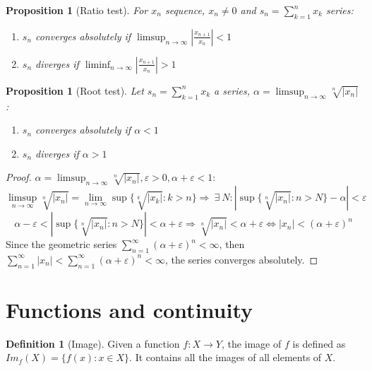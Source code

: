 \documentclass{article}
\newcommand{\DS}{\displaystyle}
\newcommand{\abs}[1]{\left|#1\right|}
\newcommand{\Ar}{\Rightarrow}
\newenvironment{enumrom}{\begin{enumerate}[label=(\roman*)]}{\end{enumerate}}
\newcommand{\fr}[2]{\frac{#1}{#2}}
\newcommand{\f}[3]{#1 : #2 \rightarrow #3}
\newcommand{\limn}{\lim_{n \to \infty}}
\newcommand{\limsupn}{\limsup_{n \to \infty}}
\newcommand{\liminfn}{\liminf_{n \to \infty}}
\theoremstyle{definition}
\newtheorem{definition}{Definition}[section]
\theoremstyle{definition}
\theoremstyle{plain}
\theoremstyle{plain}
\theoremstyle{plain}
\theoremstyle{plain}
\newtheorem{proposition}[theorem]{Proposition}
\theoremstyle{definition}
\theoremstyle{remark}
\theoremstyle{remark}
\theoremstyle{remark}
\theoremstyle{remark}
\newcommand{\sumn}{\sum_{k=1}^n}
\newcommand{\series}{\sum_{n=1}^\infty}
\newcommand{\Exists}{\ \exists \ }
\newcommand{\E}{\varepsilon}
\begin{document}
\begin{proposition}[Ratio test]
  For $x_n$ sequence, $x_n \neq 0$ and $\DS s_n = \sumn{x_k}$ series:
  \begin{enumrom}
    \item $s_n$ converges absolutely if $\limsupn \abs{\fr{x_{n+1}}{x_n}} < 1$
    \item $s_n$ diverges if $\liminfn \abs{\fr{x_{n+1}}{x_n}} > 1$
  \end{enumrom}
\end{proposition}




\begin{proposition}[Root test]
  Let $\DS s_n = \sumn{x_k}$ a series, $\DS \alpha = \limsupn \sqrt[n]{\abs{x_n}}$:
  \begin{enumrom}
    \item $s_n$ converges absolutely if $\alpha < 1$
    \item $s_n$ diverges if $\alpha > 1$
  \end{enumrom}
\end{proposition}

\begin{proof}
  $\alpha = \limsupn \sqrt[n]{\abs{x_n}}, \E > 0, \alpha + \E < 1$:
  \[
    \limsupn \sqrt[n]{\abs{x_n}} = \limn \sup\{\sqrt[k]{\abs{x_k}} : k > n\}
    \Ar \Exists N : \abs{\sup\{\sqrt[n]{\abs{x_n}} : n > N\} - \alpha} <
    \E
  \]
  \[
    \alpha - \E < \abs{\sup\{\sqrt[n]{\abs{x_n}} : n > N\}} < \alpha + \E
    \Ar \sqrt[n]{\abs{x_n}} < \alpha + \E \iff
    \abs{x_n} < (\alpha + \E)^n
  \]
  Since the geometric series $\DS \series (\alpha + \E)^n < \infty$, then $\DS \series \abs{x_n} < \series (\alpha + \E)^n < \infty$, the series converges absolutely.
\end{proof}




\section{Functions and continuity}


\begin{definition}[Image]
  Given a function $\f{f}{X}{Y}$, the image of $f$ is defined as $Im_f(X) = \{ f(x) : x \in X \}$. It contains all the images of all elements of $X$.
\end{definition}
\end{document}
